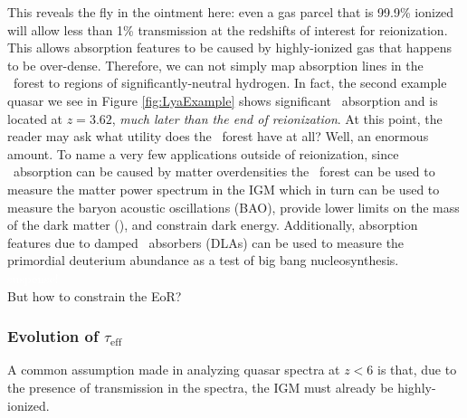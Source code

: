 This reveals the fly in the ointment here: even a gas parcel that is 99.9\% ionized will allow less than 1\% transmission at the redshifts of interest for reionization. This allows absorption features to be caused by highly-ionized gas that happens to be over-dense. Therefore, we can not simply map absorption lines in the \lya\ forest to regions of significantly-neutral hydrogen. In fact, the second example quasar we see in Figure \ref{fig:LyaExample} shows significant \lya\ absorption and is located at $z = 3.62$, \textit{much later than the end of reionization}. At this point, the reader may ask what utility does the \lya\ forest have at all? Well, an enormous amount. To name a very few applications outside of reionization, since \lya\ absorption can be caused by matter overdensities the \lya\ forest can be used to measure the matter power spectrum in the IGM which in turn can be used to measure the baryon acoustic oscillations (BAO), provide lower limits on the mass of the dark matter (\citealt{Viel:2013fqw}), and constrain dark energy. Additionally, absorption features due to damped \lya\ absorbers (DLAs) can be used to measure the primordial deuterium abundance as a test of big bang nucleosynthesis.\\
\textcolor{white}{suspense!}\\
\noindent But how to constrain the EoR?



\subsubsection{Evolution of $\tau_{\text{eff}}$}





A common assumption made in analyzing quasar spectra at $z < 6$ is that, due to the presence of transmission in the spectra, the IGM must already be highly-ionized. 



